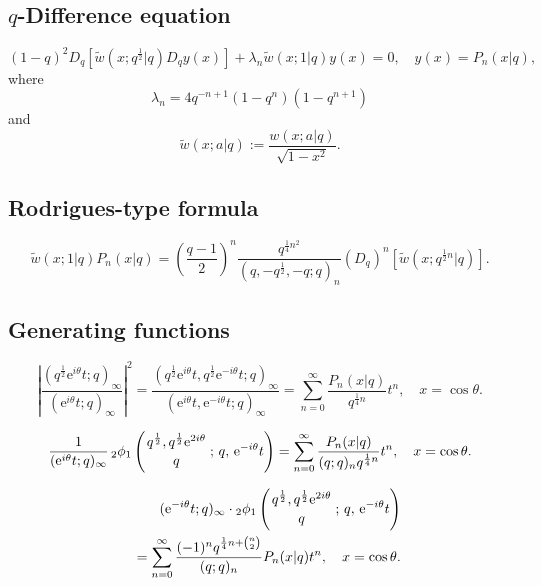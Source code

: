 \documentclass[envcountchap,graybox]{svmono}
\newcommand{\qhyp}[5]{\mbox{}_{#1}{\phi}_{#2}
\left(\genfrac{}{}{0pt}{}{#3}{#4}\,;\,q,\,#5\right)}
\newcommand{\e}{\textrm{e}}
\newcommand{\qhyp}[5]{\,\mbox{}_{#1}\phi_{#2}\!\left(
  \genfrac{}{}{0pt}{}{#3}{#4};#5\right)}
\begin{document}
\subsection*{$q$-Difference equation}
\begin{equation}
\label{dvContqLegendre}
(1-q)^2D_q\left[{\tilde w}(x;q^{\frac{1}{2}}|q)D_qy(x)\right]+
\lambda_n{\tilde w}(x;1|q)y(x)=0,\quad y(x)=P_n(x|q),
\end{equation}
where
$$\lambda_n=4q^{-n+1}(1-q^n)(1-q^{n+1})$$
and
$${\tilde w}(x;a|q):=\frac{w(x;a|q)}{\sqrt{1-x^2}}.$$

\subsection*{Rodrigues-type formula}
\begin{equation}
\label{RodContqLegendre}
{\tilde w}(x;1|q)P_n(x|q)=\left(\frac{q-1}{2}\right)^n
\frac{q^{\frac{1}{4}n^2}}{(q,-q^{\frac{1}{2}},-q;q)_n}
\left(D_q\right)^n\left[{\tilde w}(x;q^{\frac{1}{2}n}|q)\right].
\end{equation}

\subsection*{Generating functions}
\begin{equation}
\label{GenContqLegendre1}
\left|\frac{(q^{\frac{1}{2}}\e^{i\theta}t;q)_{\infty}}{(\e^{i\theta}t;q)_{\infty}}\right|^2
=\frac{(q^{\frac{1}{2}}\e^{i\theta}t,q^{\frac{1}{2}}\e^{-i\theta}t;q)_{\infty}}
{(\e^{i\theta}t,\e^{-i\theta}t;q)_{\infty}}
=\sum_{n=0}^{\infty}\frac{P_n(x|q)}{q^{\frac{1}{4}n}}t^n,\quad x=\cos\theta.
\end{equation}

\begin{equation}
\label{GenContqLegendre2}
\frac{1}{(\e^{i\theta}t;q)_{\infty}}\,
\qhyp{2}{1}{q^{\frac{1}{2}},q^{\frac{1}{2}}\e^{2i\theta}}{q}{\e^{-i\theta}t}
=\sum_{n=0}^{\infty}\frac{P_n(x|q)}{(q;q)_nq^{\frac{1}{4}n}}t^n,\quad x=\cos\theta.
\end{equation}

\begin{eqnarray}
\label{GenContqLegendre3}
& &(\e^{-i\theta}t;q)_{\infty}\cdot
\qhyp{2}{1}{q^{\frac{1}{2}},q^{\frac{1}{2}}\e^{2i\theta}}{q}{\e^{-i\theta}t}\nonumber\\
& &{}=\sum_{n=0}^{\infty}\frac{(-1)^nq^{\frac{1}{4}n+\binom{n}{2}}}{(q;q)_n}P_n(x|q)t^n,
\quad x=\cos\theta.
\end{eqnarray}
\end{document}

